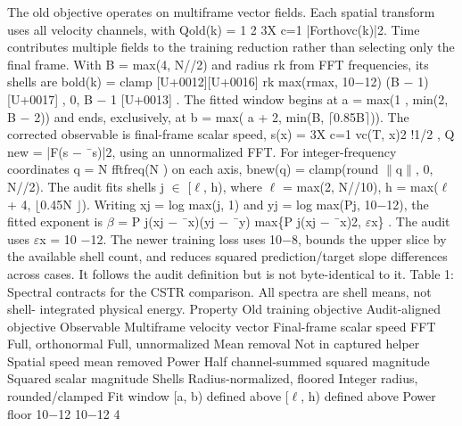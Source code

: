 \documentclass[11pt]{article}
\begin{document}
The old objective operates on multiframe vector fields. Each spatial transform uses all velocity
channels, with
Qold(k) = 1
2
3X
c=1
|Forthovc(k)|2.
Time contributes multiple fields to the training reduction rather than selecting only the final frame.
With B = max(4, N//2) and radius rk from FFT frequencies, its shells are
bold(k) = clamp
[U+0012][U+0016] rk
max(rmax, 10\ensuremath{-}12) (B \ensuremath{-} 1)
[U+0017]
, 0, B \ensuremath{-} 1
[U+0013]
.
The fitted window begins at a = max(1 , min(2, B \ensuremath{-} 2)) and ends, exclusively, at b = max( a +
2, min(B, \ensuremath{\lceil}0.85B\ensuremath{\rceil})).
The corrected observable is final-frame scalar speed,
s(x) =
3X
c=1
vc(T, x)2
!1/2
, Q new = |F(s \ensuremath{-} ¯s)|2,
using an unnormalized FFT. For integer-frequency coordinates q = N fftfreq(N ) on each axis,
bnew(q) = clamp(round \ensuremath{\parallel}q\ensuremath{\parallel}, 0, N//2).
The audit fits shells j \ensuremath{\in} [\ensuremath{\ell}, h), where
\ensuremath{\ell} = max(2, N//10), h = max(\ensuremath{\ell} + 4, \ensuremath{\lfloor}0.45N \ensuremath{\rfloor}).
Writing xj = log max(j, 1) and yj = log max(Pj, 10\ensuremath{-}12), the fitted exponent is
\ensuremath{\beta} =
P
j(xj \ensuremath{-} ¯x)(yj \ensuremath{-} ¯y)
max\{P
j(xj \ensuremath{-} ¯x)2, \ensuremath{\varepsilon}x\} .
The audit uses \ensuremath{\varepsilon}x = 10 \ensuremath{-}12. The newer training loss uses 10\ensuremath{-}8, bounds the upper slice by the
available shell count, and reduces squared prediction/target slope differences across cases. It follows
the audit definition but is not byte-identical to it.
Table 1: Spectral contracts for the CSTR comparison. All spectra are shell means, not shell-
integrated physical energy.
Property Old training objective Audit-aligned objective
Observable Multiframe velocity vector Final-frame scalar speed
FFT Full, orthonormal Full, unnormalized
Mean removal Not in captured helper Spatial speed mean removed
Power Half channel-summed squared
magnitude
Squared scalar magnitude
Shells Radius-normalized, floored Integer radius,
rounded/clamped
Fit window [a, b) defined above [\ensuremath{\ell}, h) defined above
Power floor 10\ensuremath{-}12 10\ensuremath{-}12
4
\end{document}
